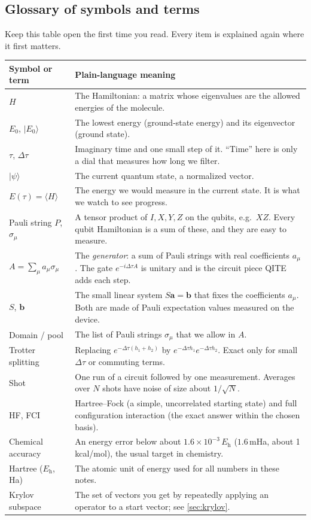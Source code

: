 \documentclass[11pt,a4paper]{article}
\newcommand{\ket}[1]{\lvert #1\rangle}
\newcommand{\ex}[1]{\langle #1\rangle}
\newcommand{\dt}{\Delta\tau}
\newcommand{\Eh}{E_{\mathrm h}}
\begin{document}
\subsection*{Glossary of symbols and terms}
Keep this table open the first time you read. Every item is explained again where it first matters.

\begin{center}
\small
\begin{tabularx}{\linewidth}{@{}p{3.1cm}X@{}}
\toprule
Symbol or term & Plain-language meaning\\\midrule
$H$ & The Hamiltonian: a matrix whose eigenvalues are the allowed energies of the molecule.\\
$E_0$, $\ket{E_0}$ & The lowest energy (ground-state energy) and its eigenvector (ground state).\\
$\tau$, $\dt$ & Imaginary time and one small step of it. ``Time'' here is only a dial that measures how long we filter.\\
$\ket{\psi}$ & The current quantum state, a normalized vector.\\
$E(\tau)=\ex{H}$ & The energy we would measure in the current state. It is what we watch to see progress.\\
Pauli string $P$, $\sigma_\mu$ & A tensor product of $I,X,Y,Z$ on the qubits, e.g.\ $XZ$. Every qubit Hamiltonian is a sum of these, and they are easy to measure.\\
$A=\sum_\mu a_\mu\sigma_\mu$ & The \emph{generator}: a sum of Pauli strings with real coefficients $a_\mu$. The gate $e^{-i\dt A}$ is unitary and is the circuit piece QITE adds each step.\\
$S$, $\bm b$ & The small linear system $S\bm a=\bm b$ that fixes the coefficients $a_\mu$. Both are made of Pauli expectation values measured on the device.\\
Domain / pool & The list of Pauli strings $\sigma_\mu$ that we allow in $A$.\\
Trotter splitting & Replacing $e^{-\dt(h_1+h_2)}$ by $e^{-\dt h_1}e^{-\dt h_2}$. Exact only for small $\dt$ or commuting terms.\\
Shot & One run of a circuit followed by one measurement. Averages over $N$ shots have noise of size about $1/\sqrt N$.\\
HF, FCI & Hartree--Fock (a simple, uncorrelated starting state) and full configuration interaction (the exact answer within the chosen basis).\\
Chemical accuracy & An energy error below about $1.6\times10^{-3}\,\Eh$ ($1.6$\,mHa, about 1\,kcal/mol), the usual target in chemistry.\\
Hartree ($\Eh$, Ha) & The atomic unit of energy used for all numbers in these notes.\\
Krylov subspace & The set of vectors you get by repeatedly applying an operator to a start vector; see \cref{sec:krylov}.\\
\bottomrule
\end{tabularx}
\end{center}
\end{document}
